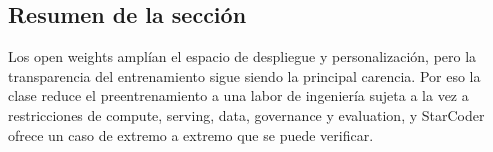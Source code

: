 \subsection{Resumen de la sección}

Los open weights amplían el espacio de despliegue y personalización, pero la transparencia del entrenamiento sigue siendo la principal carencia. Por eso la clase reduce el preentrenamiento a una labor de ingeniería sujeta a la vez a restricciones de compute, serving, data, governance y evaluation, y StarCoder ofrece un caso de extremo a extremo que se puede verificar.
